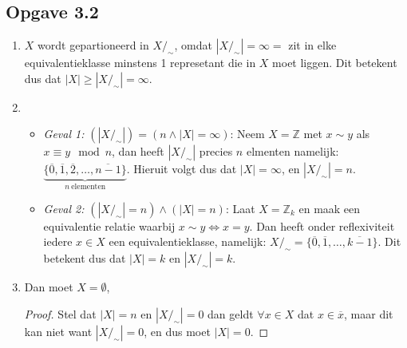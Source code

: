 \documentclass{article}
\newcommand{\Z}{\mathbb{Z}}
\newcommand{\q}{/_\sim}
\newcommand{\ol}[1]{\overline{#1}}
\begin{document}
\subsection*{Opgave 3.2}
\begin{enumerate}[label=\alph*)]
	\item $X$ wordt gepartioneerd in $X/_\sim$, omdat $|X/_\sim| = \infty =$ zit in elke equivalentieklasse minstens 1 represetant die in $X$ moet liggen. Dit betekent dus dat $|X| \geq |X/_\sim| = \infty$.
	\item
	      \begin{itemize}
		      \item \emph{Geval 1:} $(|X/_\sim|) = (n \wedge |X| = \infty)$:
		            Neem $X=\Z$ met $x \sim y$ als $x \equiv y \mod n$, dan
		            heeft $|X\q|$ precies $n$ elmenten namelijk: $\underbrace{\{ \ol{0}, \ol{1}, \ol{2}, \dots ,\ol{n-1} \}}_{n\ \text{elementen}}$.
		            Hieruit volgt dus dat $|X| = \infty$, en $|X\q| = n$.
		      \item \emph{Geval 2:} $(|X\q|  = n) \wedge (|X| = n)$:
		            Laat $X = \Z_{k}$ en maak een equivalentie relatie waarbij $x \sim y \Longleftrightarrow x = y$.
		            Dan heeft onder reflexiviteit iedere $x \in X$ een equivalentieklasse,
		            namelijk: $X\q = \{\ol{0}, \ol{1}, \dots , \ol{k-1} \}$.
		            Dit betekent dus dat $|X| = k$ en $|X\q| = k$.
	      \end{itemize}
	\item
	      Dan moet $X = \emptyset$,
	      \begin{proof}
		      Stel dat $|X| = n$ en $|X\q| = 0$ dan geldt $\forall x \in
			      X$ dat $x \in \ol{x}$,
		      maar dit kan niet want $|X\q| = 0$, en dus
		      moet $|X| = 0$.
	      \end{proof}
\end{enumerate}
\end{document}
